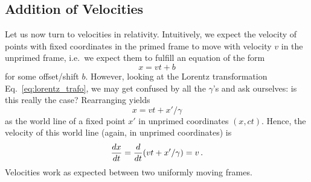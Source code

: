 \documentclass[../relativity_main.tex]{subfiles}
\begin{document}
		\subsection{Addition of Velocities}
		\label{subsec:vel_add}
Let us now turn to velocities in relativity. Intuitively, we expect the velocity of points with fixed coordinates in the primed frame to move with velocity $v$ in the unprimed frame, i.e.~we expect them to fulfill an equation of the form
\begin{equation*}
	x = v t + b
\end{equation*}
for some offset/shift $b$. However, looking at the Lorentz transformation Eq.~\eqref{eq:lorentz_trafo}, we may get confused by all the $\gamma$'s and ask ourselves: is this really the case? Rearranging yields
\begin{equation}
	x = v t + x' / \gamma
\end{equation}
as the world line of a fixed point $x'$ in unprimed coordinates $(x, c t)$. Hence, the velocity of this world line (again, in unprimed coordinates) is
\begin{equation}
	\dv{x}{t} = \dv{t} (v t + x' / \gamma) = v \, .
\end{equation}
Velocities work as expected between two uniformly moving frames.\\
\end{document}
